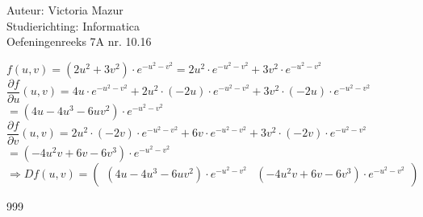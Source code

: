 \documentclass[a4paper]{article}
\begin{document}
  
\noindent \large Auteur: Victoria Mazur \\
\noindent \large Studierichting: Informatica\\
\noindent \large Oefeningenreeks 7A nr. 10.16\\

\medskip

\normalsize

$f(u, v) = (2u^2 + 3v^2) \cdot e^{-u^2-v^2} = 2u^2 \cdot e^{-u^2-v^2} + 3v^2 \cdot e^{-u^2-v^2}$ \\

$\dfrac{\partial f}{\partial u}(u, v) = 4u \cdot e^{-u^2-v^2} + 2u^2 \cdot (-2u) \cdot e^{-u^2-v^2} + 3v^2 \cdot (-2u) \cdot e^{-u^2-v^2}$ \\

$= (4u - 4u^3 - 6uv^2) \cdot e^{-u^2-v^2}$ \\

$\dfrac{\partial f}{\partial v}(u, v) = 2u^2 \cdot (-2v) \cdot e^{-u^2-v^2} + 6v \cdot e^{-u^2-v^2} + 3v^2 \cdot (-2v) \cdot e^{-u^2-v^2}$ \\

$= (-4u^2v + 6v - 6v^3) \cdot e^{-u^2-v^2}$ \\

$\Rightarrow Df(u, v) = \left( \begin{array}{cc} (4u - 4u^3 - 6uv^2) \cdot e^{-u^2-v^2} & (-4u^2v + 6v - 6v^3) \cdot e^{-u^2-v^2} \end{array} \right)$ \\

\begin{thebibliography}{999}
\end{thebibliography}
\end{document}
